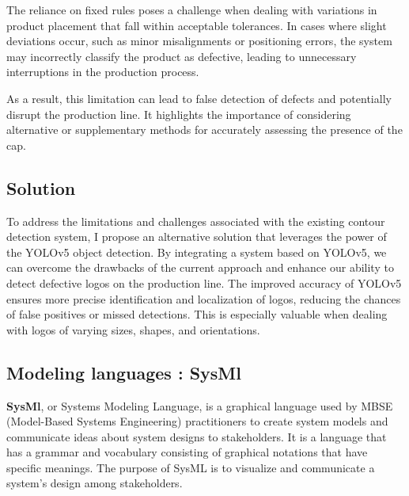 The reliance on fixed rules poses a challenge when dealing with variations in product placement that fall within acceptable tolerances. In cases where slight deviations occur, such as minor misalignments or positioning errors, the system may incorrectly classify the product as defective, leading to unnecessary interruptions in the production process.

As a result, this limitation can lead to false detection of defects and potentially disrupt the production line. It highlights the importance of considering alternative or supplementary methods for accurately assessing the presence of the cap.

\subsection{Solution}
To address the limitations and challenges associated with the existing contour detection system, I propose an alternative solution that leverages the power of the YOLOv5 object detection.
By integrating a system based on YOLOv5, we can overcome the drawbacks of the current approach and enhance our ability to detect defective logos on the production line. The improved accuracy of YOLOv5 ensures more precise identification and localization of logos, reducing the chances of false positives or missed detections. This is especially valuable when dealing with logos of varying sizes, shapes, and orientations.
\vspace{1em}

\subsection{Modeling languages : SysMl}
\textbf{SysMl},  or Systems Modeling Language, is a graphical language used by MBSE (Model-Based Systems Engineering) practitioners to create system models and communicate ideas about system designs to stakeholders. It is a language that has a grammar and vocabulary consisting of graphical notations that have specific meanings. The purpose of SysML is to visualize and communicate a system's design among stakeholders.\cite{LD13}

